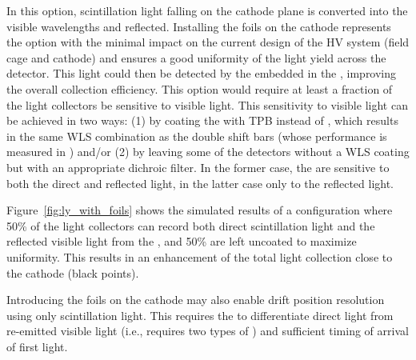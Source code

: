 
In this option, scintillation light falling on the cathode plane is converted into the visible wavelengths and reflected.
Installing the foils on the cathode represents the option  with the minimal impact on the current design of the HV system (field cage and cathode) and ensures a good uniformity of the light yield across the detector.
This light could then be detected by the  embedded in the , improving the overall collection efficiency. This option would require at least a fraction of the light collectors be sensitive to visible light. This sensitivity to visible light can be achieved in two ways: (1) by coating the  with TPB instead of , which results in the same WLS combination as the double shift bars (whose performance is measured in )
and/or (2) by leaving some of the  detectors without a  
WLS coating but with an appropriate dichroic filter. In the former case, the  are sensitive to both the direct and reflected light, in the latter case only to the reflected light. 

Figure~\ref{fig:ly_with_foils} shows the simulated results of a configuration where 50\% of the  light collectors can %
record both direct scintillation light and the reflected visible light from the ,  and 50\% are left uncoated to maximize uniformity. This results in an enhancement of the total light collection close to the cathode (black points). %

Introducing the foils on the cathode may also enable drift position resolution using only scintillation light. This requires the  to  
differentiate direct  light from re-emitted visible light (i.e., requires two 
types of ) and 
sufficient timing of arrival of first light.

